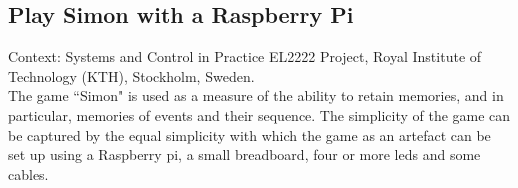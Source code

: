 \subsection{Play Simon with a Raspberry Pi}

Context: Systems and Control in Practice EL2222 Project, Royal Institute of
Technology (KTH), Stockholm, Sweden.\\

The game ``Simon" is used as a measure of the ability to retain memories, and in
particular, memories of events and their sequence. The simplicity of the game
can be captured by the equal simplicity with which the game as an artefact can
be set up using a Raspberry pi, a small breadboard, four or more leds
and some cables.
